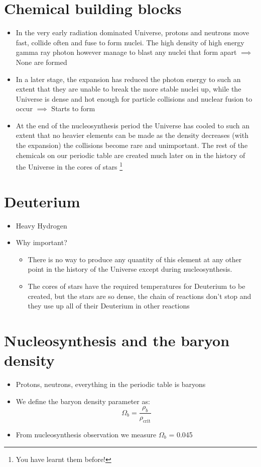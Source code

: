 \documentclass{article}
\begin{document}
\section{Chemical building blocks}
\begin{itemize}
\item In the very early radiation dominated Universe, protons and neutrons move fast, collide often and fuse to form nuclei. The high density of high energy gamma ray photon however manage to
blast any nuclei that form apart $\implies$ None are formed
\item In a later stage, the expansion has reduced the photon energy to such an extent that they are unable to break the more stable nuclei up, while the Universe is dense and hot
enough for particle collisions and nuclear fusion to occur $\implies$ Starts to form
\item At the end of the nucleosynthesis period the Universe has cooled to such an extent that no
heavier elements can be made as the density decreases (with the expansion) the collisions
become rare and unimportant. The rest of the chemicals on our periodic table are created much
later on in the history of the Universe in the cores of stars \footnote{You have learnt them before!}
\end{itemize}
\section{Deuterium}
\begin{itemize}
\item Heavy Hydrogen 
\item Why important?
\begin{itemize}
\item There is no way to produce any quantity of this element at
any other point in the history of the Universe except during nucleosynthesis.
\item  The cores of stars have the required temperatures for Deuterium to be created, but the stars are so dense, the chain of reactions don’t stop and they use up all of their Deuterium in other reactions
\end{itemize}
\end{itemize}
\section{Nucleosynthesis and the baryon density}
\begin{itemize}
\item Protons, neutrons, everything in the periodic table is baryons
\item We define the baryon density parameter as:
\begin{equation}
\Omega_b=\frac{\rho_b}{\rho_\text{crit}}
\end{equation}
\item From nucleosynthesis observation we measure $\Omega_b$ = 0.045
\end{itemize}
\end{document}
